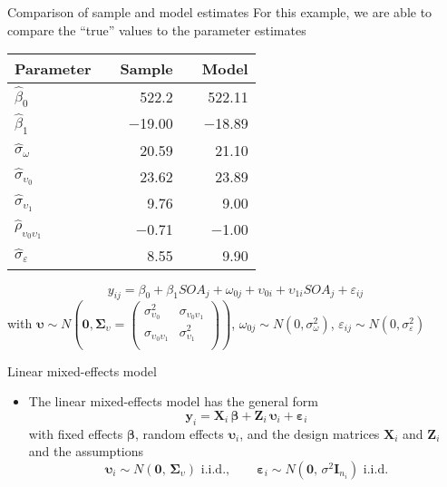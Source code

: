 \documentclass{beamer}
\newcommand{\vect}[1]{\mathbf{#1}}
\newcommand{\mat}[1]{\mathbf{#1}}
\newcommand{\gvect}[1]{\boldsymbol{#1}}
\newcommand{\gmat}[1]{\boldsymbol{#1}}
\begin{document}
\begin{frame}{Comparison of sample and model estimates}
  For this example, we are able to compare the ``true'' values to the
  parameter estimates
  \begin{center}
  \begin{tabular}{lrrrr}
    \hline
    Parameter && Sample && Model \\
    \hline
    $\hat\beta_0$ && 522.2 && 522.11\\
    $\hat\beta_1$ && $-$19.00 && $-$18.89\\
    $\hat\sigma_{\omega}$ && 20.59 && 21.10\\
    $\hat\sigma_{\upsilon_0}$ && 23.62 && 23.89\\
    $\hat\sigma_{\upsilon_1}$ && 9.76 && 9.00\\
    $\hat\rho_{\upsilon_0\upsilon_1}$ && $-$0.71 && $-$1.00\\
    $\hat\sigma_{\varepsilon}$ && 8.55 && 9.90\\
    \hline
  \end{tabular}
  \end{center}
     \[
       y_{ij} = \beta_0 + \beta_1 SOA_j + \omega_{0j} + \upsilon_{0i} +
       \upsilon_{1i} SOA_j + \varepsilon_{ij} 
  \]
\small
with $\gvect{\upsilon} \sim N\left(\gvect{0}, \gmat{\Sigma}_{\upsilon} = 
    \begin{pmatrix}
      \sigma^2_{\upsilon_0} & \sigma_{\upsilon_0\upsilon_1} \\
      \sigma_{\upsilon_0\upsilon_1} & \sigma^2_{\upsilon_1} \\
    \end{pmatrix}\right)$,
  $\omega_{0j} \sim N(0, \sigma_{\omega}^2)$, $\varepsilon_{ij} \sim N(0,
  \sigma_{\varepsilon}^2)$ 
\end{frame}


\begin{frame}{Linear mixed-effects model}
  \begin{itemize}
    \item The linear mixed-effects model has the general form
\[
  \vect{y}_i = \mat{X}_i \, \gvect{\beta} + \mat{Z}_i \, \gvect{\upsilon}_i +
               \gvect{\varepsilon}_i
\]
with fixed effects $\gvect{\beta}$, random effects
$\gvect{\upsilon}_i$, and the design matrices $\mat{X}_i$ and $\mat{Z}_i$
  and the assumptions
\[
  \gvect{\upsilon}_i \sim N(\vect{0}, \, \gmat{\Sigma}_\upsilon)
    \text{ i.i.d.}, \qquad
  \gvect{\varepsilon}_i \sim N(\vect{0}, \, \sigma^2 \mat{I}_{n_i})
    \text{ i.i.d.}
\]
  \end{itemize}
\end{frame}
\end{document}
